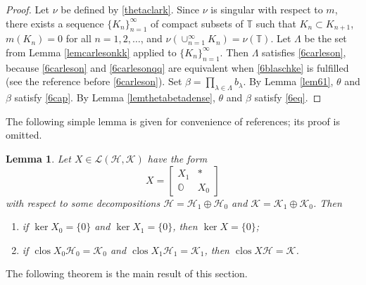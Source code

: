 \documentclass[a4paper,oneside,11pt]{amsart}
\numberwithin{equation}{section}
\theoremstyle{plain}
\newtheorem{lemma}[theorem]{Lemma}
\theoremstyle{definition}
\begin{document}
\begin{proof} Let $\nu$ be defined by \eqref{thetaclark}. Since $\nu$ is singular with respect to $m$, there exists a sequence $\{K_n\}_{n=1}^\infty$ 
of compact subsets of $\mathbb T$ 
such that $K_n\subset K_{n+1}$, 
$m(K_n)=0$ for all $n=1,2, \ldots$, and $\nu(\cup_{n=1}^\infty K_n)=\nu(\mathbb T)$. Let $\Lambda$ 
 be the set from Lemma \ref{lemcarlesonkk} applied to $\{K_n\}_{n=1}^\infty$. Then  $\Lambda$    
satisfies \eqref{6carleson}, because \eqref{6carleson} and \eqref{6carlesonqq} are equivalent
 when \eqref{6blaschke} is fulfilled (see the reference before \eqref{6carleson}).  Set $\beta=\prod_{\lambda\in\Lambda}b_\lambda$. By Lemma \ref{lem61}, $\theta$ and $\beta$ satisfy \eqref{6cap}. 
By Lemma \ref{lemthetabetadense}, $\theta$ and $\beta$ satisfy \eqref{6eq}. 
\end{proof}

The following simple lemma is given for convenience of references; its proof is omitted. 

\begin{lemma} \label{lem6kerdense} Let $X\in\mathcal L(\mathcal H,\mathcal K)$ have the form 
 \begin{equation*} X=\left[\begin{matrix} X_1 & * \\ \mathbb O  & X_0\end{matrix}\right]
\end{equation*} with respect to some decompositions $\mathcal H=\mathcal H_1\oplus \mathcal H_0$ and 
$\mathcal K=\mathcal K_1\oplus \mathcal K_0$. Then  \begin{enumerate}[\upshape (i)]

\item if $\ker X_0=\{0\}$ and $\ker X_1=\{0\}$, then $\ker X=\{0\}$;

\item if  $\operatorname{clos}X_0\mathcal H_0=\mathcal K_0$ and  $\operatorname{clos}X_1\mathcal H_1=\mathcal K_1$, then 
$\operatorname{clos}X\mathcal H=\mathcal K$.
\end{enumerate}
\end{lemma}

The following theorem is the main result of this section. 
\end{document}
